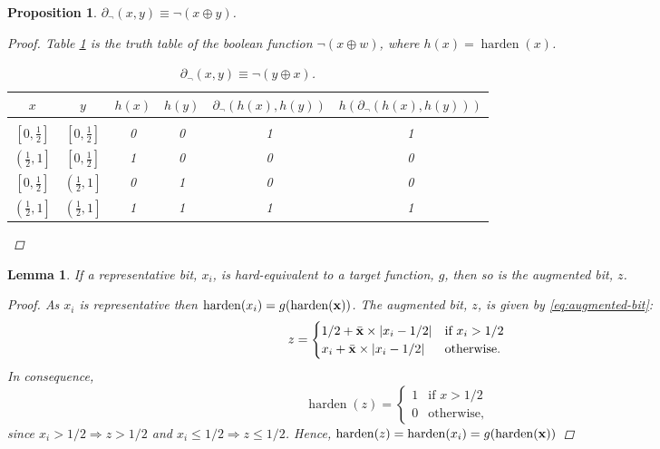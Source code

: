 \documentclass{article} %
\newtheorem{prop}{Proposition}
\newtheorem{lemma}{Lemma}
\begin{document}
\begin{prop}\label{prop:not}
	$\partial_{\neg}(x,y) \equiv \neg (x \oplus y)$.
\begin{proof}
	Table \ref{not-table} is the truth table of the boolean function $\neg (x \oplus w)$, where $h(x) = \operatorname{harden}(x)$.
	\begin{table}[t!]
		\begin{center}
			\begin{tabular}{cccccc}
				\multicolumn{1}{c}{$x$}  &\multicolumn{1}{c}{$y$}  &\multicolumn{1}{c}{$h(x)$}  &\multicolumn{1}{c}{$h(y)$} &\multicolumn{1}{c}{$\partial_{\neg}(h(x), h(y))$} &\multicolumn{1}{c}{$h(\partial_{\neg}(h(x), h(y)))$}
				\\ \hline \\
				$\left[0, \frac{1}{2}\right]$ & $\left[0, \frac{1}{2}\right]$ & 0 & 0 & 1 & 1\\[0.1cm]
				$\left(\frac{1}{2}, 1\right]$ & $\left[0, \frac{1}{2}\right]$ &1 & 0 & 0 & 0\\[0.1cm]
				$\left[0, \frac{1}{2}\right]$ & $\left(\frac{1}{2}, 1\right]$ &0 & 1 & 0 & 0\\[0.1cm]
				$\left(\frac{1}{2}, 1\right]$ & $\left(\frac{1}{2}, 1\right]$ &1 & 1 & 1 & 1\\[0.1cm]
			\end{tabular}
		\end{center}
		\caption{$\partial_{\neg}(x,y) \equiv \neg (y \oplus x)$.}\label{not-table}
	\end{table}
\end{proof}
\end{prop}

\begin{lemma}\label{prop:augmented}
	If a representative bit, $x_{i}$, is hard-equivalent to a target function, $g$, then so is the augmented bit, $z$.
	\begin{proof}
		As $x_{i}$ is representative then $\operatorname{harden}(x_{i}) = g(\operatorname{harden}({\bf x}))$. The augmented bit, $z$, is given by  \eqref{eq:augmented-bit}:
		\begin{equation*}
		z = \begin{cases}
		1/2 + \bar{\bf x}\times|x_{i} - 1/2| & \text{if } x_{i} > 1/2 \\
		x_{i} + \bar{\bf x}\times|x_{i} - 1/2| & \text{otherwise.}
		\end{cases}
		\end{equation*}
		In consequence,
		\begin{equation*}
		\operatorname{harden}(z) = \begin{cases}
		1 & \text{if } x > 1/2 \\
		0 & \text{otherwise,}
		\end{cases}
		\end{equation*}
		since $x_{i} > 1/2 \Rightarrow z > 1/2$ and $x_{i} \leq 1/2 \Rightarrow z \leq 1/2$. Hence, $\operatorname{harden}(z) = \operatorname{harden}(x_{i}) = g(\operatorname{harden}({\bf x}))$
	\end{proof}
\end{lemma}
\end{document}
